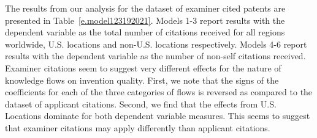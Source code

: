 \documentclass[12pt,letterpaper]{article}
\begin{document}
%


%
%

The results from our analysis for the dataset of examiner cited patents are presented in Table~\ref{e.model123192021}. Models 1-3 report results with the dependent variable as the total number of citations received for all regions worldwide, U.S. locations and non-U.S. locations respectively. Models 4-6 report results with the dependent variable as the number of non-self citations received. Examiner citations seem to suggest very different effects for the nature of knowledge flows on invention quality. First, we note that the signs of the coefficients for each of the three categories of flows is reversed as compared to the dataset of applicant citations. Second, we find that the effects from U.S. Locations dominate for both dependent variable measures. This seems to suggest that examiner citations may apply differently than applicant citations.


\end{document}
